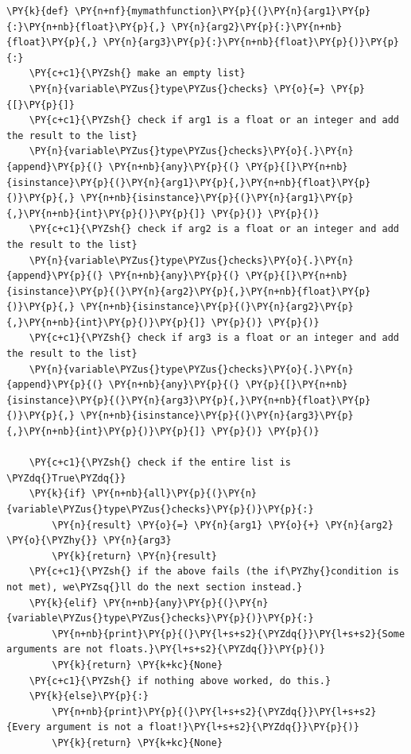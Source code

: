     \begin{tcolorbox}[breakable, size=fbox, boxrule=1pt, pad at break*=1mm,colback=cellbackground, colframe=cellborder]
\begin{Verbatim}[commandchars=\\\{\}]
\PY{k}{def} \PY{n+nf}{mymathfunction}\PY{p}{(}\PY{n}{arg1}\PY{p}{:}\PY{n+nb}{float}\PY{p}{,} \PY{n}{arg2}\PY{p}{:}\PY{n+nb}{float}\PY{p}{,} \PY{n}{arg3}\PY{p}{:}\PY{n+nb}{float}\PY{p}{)}\PY{p}{:}
    \PY{c+c1}{\PYZsh{} make an empty list}
    \PY{n}{variable\PYZus{}type\PYZus{}checks} \PY{o}{=} \PY{p}{[}\PY{p}{]}
    \PY{c+c1}{\PYZsh{} check if arg1 is a float or an integer and add the result to the list}
    \PY{n}{variable\PYZus{}type\PYZus{}checks}\PY{o}{.}\PY{n}{append}\PY{p}{(} \PY{n+nb}{any}\PY{p}{(} \PY{p}{[}\PY{n+nb}{isinstance}\PY{p}{(}\PY{n}{arg1}\PY{p}{,}\PY{n+nb}{float}\PY{p}{)}\PY{p}{,} \PY{n+nb}{isinstance}\PY{p}{(}\PY{n}{arg1}\PY{p}{,}\PY{n+nb}{int}\PY{p}{)}\PY{p}{]} \PY{p}{)} \PY{p}{)}
    \PY{c+c1}{\PYZsh{} check if arg2 is a float or an integer and add the result to the list}
    \PY{n}{variable\PYZus{}type\PYZus{}checks}\PY{o}{.}\PY{n}{append}\PY{p}{(} \PY{n+nb}{any}\PY{p}{(} \PY{p}{[}\PY{n+nb}{isinstance}\PY{p}{(}\PY{n}{arg2}\PY{p}{,}\PY{n+nb}{float}\PY{p}{)}\PY{p}{,} \PY{n+nb}{isinstance}\PY{p}{(}\PY{n}{arg2}\PY{p}{,}\PY{n+nb}{int}\PY{p}{)}\PY{p}{]} \PY{p}{)} \PY{p}{)}
    \PY{c+c1}{\PYZsh{} check if arg3 is a float or an integer and add the result to the list}
    \PY{n}{variable\PYZus{}type\PYZus{}checks}\PY{o}{.}\PY{n}{append}\PY{p}{(} \PY{n+nb}{any}\PY{p}{(} \PY{p}{[}\PY{n+nb}{isinstance}\PY{p}{(}\PY{n}{arg3}\PY{p}{,}\PY{n+nb}{float}\PY{p}{)}\PY{p}{,} \PY{n+nb}{isinstance}\PY{p}{(}\PY{n}{arg3}\PY{p}{,}\PY{n+nb}{int}\PY{p}{)}\PY{p}{]} \PY{p}{)} \PY{p}{)}

    \PY{c+c1}{\PYZsh{} check if the entire list is \PYZdq{}True\PYZdq{}}
    \PY{k}{if} \PY{n+nb}{all}\PY{p}{(}\PY{n}{variable\PYZus{}type\PYZus{}checks}\PY{p}{)}\PY{p}{:}
        \PY{n}{result} \PY{o}{=} \PY{n}{arg1} \PY{o}{+} \PY{n}{arg2} \PY{o}{\PYZhy{}} \PY{n}{arg3}
        \PY{k}{return} \PY{n}{result}
    \PY{c+c1}{\PYZsh{} if the above fails (the if\PYZhy{}condition is not met), we\PYZsq{}ll do the next section instead.}
    \PY{k}{elif} \PY{n+nb}{any}\PY{p}{(}\PY{n}{variable\PYZus{}type\PYZus{}checks}\PY{p}{)}\PY{p}{:}
        \PY{n+nb}{print}\PY{p}{(}\PY{l+s+s2}{\PYZdq{}}\PY{l+s+s2}{Some arguments are not floats.}\PY{l+s+s2}{\PYZdq{}}\PY{p}{)}
        \PY{k}{return} \PY{k+kc}{None}
    \PY{c+c1}{\PYZsh{} if nothing above worked, do this.}
    \PY{k}{else}\PY{p}{:}
        \PY{n+nb}{print}\PY{p}{(}\PY{l+s+s2}{\PYZdq{}}\PY{l+s+s2}{Every argument is not a float!}\PY{l+s+s2}{\PYZdq{}}\PY{p}{)}
        \PY{k}{return} \PY{k+kc}{None}
\end{Verbatim}
\end{tcolorbox}

